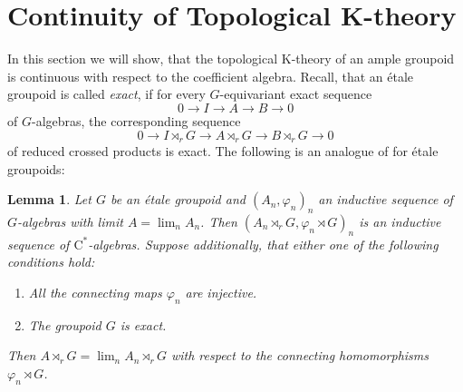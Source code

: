 \documentclass[reqno,oneside,a4paper,11pt]{amsart}
\theoremstyle{theorem}
\newtheorem{lemma}[satz]{Lemma}
\theoremstyle{definition}
\newcommand{\K}{\mathrm K}
\begin{document}
	\section{Continuity of Topological K-theory}
	In this section we will show, that the topological $\K$-theory of an ample groupoid is continuous with respect to the coefficient algebra.
	Recall, that an étale groupoid is called \textit{exact}, if for every $G$-equivariant exact sequence
	$$0\rightarrow I\rightarrow A\rightarrow B\rightarrow 0$$
	of $G$-algebras, the corresponding sequence
		$$0\rightarrow I\rtimes_r G\rightarrow A\rtimes_r G\rightarrow B\rtimes_r G \rightarrow 0$$
		of reduced crossed products is exact.
	The following is an analogue of \cite[Lemma~2.5]{MR2010742} for étale groupoids:
	\begin{lemma}\label{Lemma:Proper Groupoids and inductive limits}
		Let $G$ be an étale groupoid and $(A_n,\varphi_n)_n$ an inductive sequence of $G$-algebras with limit $A=\lim_n A_n$. Then $(A_n\rtimes_r G,\varphi_n\rtimes G)_n$ is an inductive sequence of $\mathrm{C}^*$-algebras. Suppose additionally, that either one of the following conditions hold:
		\begin{enumerate}
			\item All the connecting maps $\varphi_n$ are injective.
			\item The groupoid $G$ is exact.
		\end{enumerate}
		Then $A\rtimes_r G=\lim_n A_n\rtimes_r G$ with respect to the connecting homomorphisms $\varphi_n\rtimes G$.
	\end{lemma}
\end{document}
